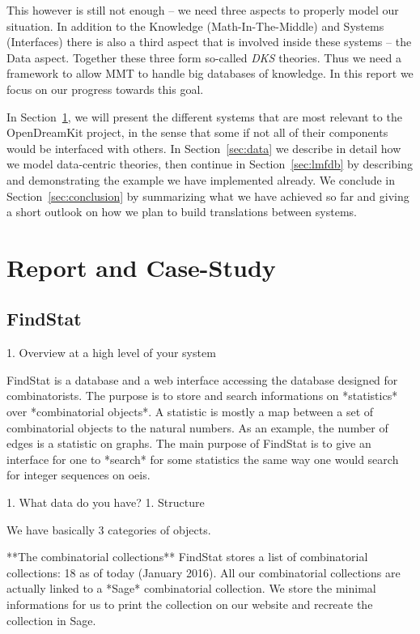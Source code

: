 \documentclass{deliverablereport}
\begin{document}
This however is still not enough -- we need three aspects to properly model our situation. In addition to the Knowledge (Math-In-The-Middle) and Systems (Interfaces) there is also a third aspect that is involved inside these systems -- the Data aspect. Together these three form so-called \textit{DKS} theories. Thus we need a framework to allow MMT to handle big databases of knowledge. In this report we focus on our progress towards this goal.



In Section~\ref{casestudy}, we will present the different systems that are most relevant to the OpenDreamKit project, in the sense that some if not all of their components would be interfaced with others.
In Section~\ref{sec:data} we describe in detail how we model data-centric theories, then continue in Section~\ref{sec:lmfdb} by describing and demonstrating the example we have implemented already. We conclude in Section~\ref{sec:conclusion} by summarizing what we have achieved so far and giving a short outlook on how we plan to build translations between systems.

\section{Report and Case-Study}\label{casestudy}
\subsection{FindStat}
1. Overview at a high level of your system

FindStat is a database and a web interface accessing the database designed for combinatorists.
The purpose is to store and search informations on *statistics* over *combinatorial objects*.
A statistic is mostly a map between a set of combinatorial objects to the natural numbers. As an
example, the number of edges is a statistic on graphs. The main purpose of FindStat is to give an
interface for one to *search* for some statistics the same way one would search for integer sequences
on oeis.

1. What data do you have?
 1. Structure

We have basically 3 categories of objects.

**The combinatorial collections** FindStat stores a list of combinatorial collections: 18 as of today (January 2016).
All our combinatorial collections are actually linked to a *Sage* combinatorial collection. We store the minimal informations
for us to print the collection on our website and recreate the collection in Sage.
\end{document}
